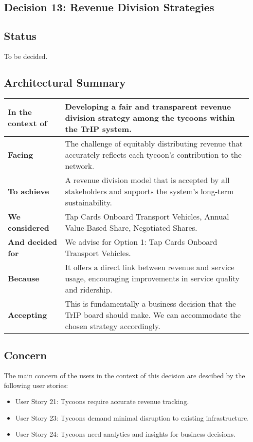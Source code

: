 \subsection{Decision 13: Revenue Division Strategies}

\subsection*{Status}
To be decided.

\subsection*{Architectural Summary}
\begin{tabular}{|p{3.5cm}|p{10.5cm}|}
    \hline
    \textbf{In the context of} & Developing a fair and transparent revenue division strategy among the tycoons within the TrIP system. \\
    \hline
    \textbf{Facing} & The challenge of equitably distributing revenue that accurately reflects each tycoon's contribution to the network. \\
    \hline
    \textbf{To achieve} & A revenue division model that is accepted by all stakeholders and supports the system's long-term sustainability. \\
    \hline
    \textbf{We considered} & Tap Cards Onboard Transport Vehicles, Annual Value-Based Share, Negotiated Shares. \\
    \hline
    \textbf{And decided for} & We advise for Option 1: Tap Cards Onboard Transport Vehicles. \\
    \hline
    \textbf{Because} & It offers a direct link between revenue and service usage, encouraging improvements in service quality and ridership. \\
    \hline
    \textbf{Accepting} & This is fundamentally a business decision that the TrIP board should make. We can accommodate the chosen strategy accordingly. \\
    \hline
\end{tabular}

\subsection*{Concern}
The main concern of the users in the context of this decision are descibed by the following user stories: 
\begin{itemize}
    \item User Story 21: Tycoons require accurate revenue tracking.
    \item User Story 23: Tycoons demand minimal disruption to existing infrastructure.
    \item User Story 24: Tycoons need analytics and insights for business decisions.
\end{itemize}

